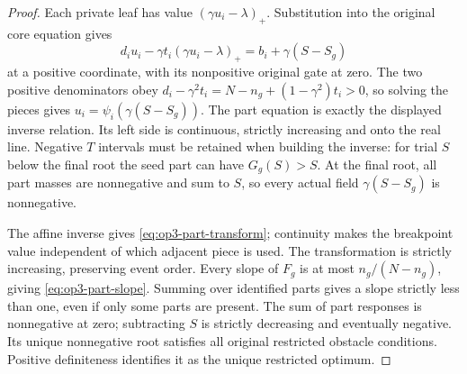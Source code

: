 \begin{proof}
Each private leaf has value $(\gamma u_i-\lambda)_+$. Substitution into
the original core equation gives
\[
 d_i u_i-\gamma t_i(\gamma u_i-\lambda)_+
       =b_i+\gamma(S-S_g)
\]
at a positive coordinate, with its nonpositive original gate at zero.
The two positive denominators obey
$d_i-\gamma^2t_i=N-n_g+(1-\gamma^2)t_i>0$, so solving the pieces gives
$u_i=\psi_i(\gamma(S-S_g))$. The part equation is exactly the displayed
inverse relation. Its left side is continuous, strictly increasing and
onto the real line. Negative $T$ intervals must be retained when building
the inverse: for trial $S$ below the final root the seed part can have
$G_g(S)>S$. At the final root, all part masses are nonnegative and sum to
$S$, so every actual field $\gamma(S-S_g)$ is nonnegative.

The affine inverse gives \cref{eq:op3-part-transform}; continuity makes
the breakpoint value independent of which adjacent piece is used.
The transformation is strictly increasing, preserving event order.
Every slope of $F_g$ is at most $n_g/(N-n_g)$, giving
\cref{eq:op3-part-slope}. Summing over identified parts gives a slope
strictly less than one, even if only some parts are present.
The sum of part responses is nonnegative at zero; subtracting $S$ is
strictly decreasing and eventually negative. Its unique nonnegative root
satisfies all original restricted obstacle conditions. Positive definiteness
identifies it as the unique restricted optimum.
\end{proof}

